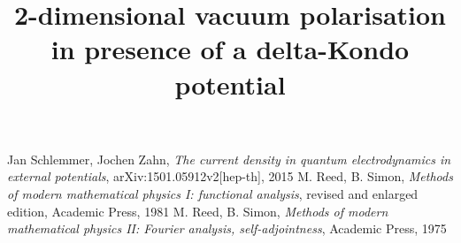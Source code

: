\documentclass[11pt, oneside]{article}   	%
\title{2-dimensional vacuum polarisation in presence of a delta-Kondo potential}
\author{}
\begin{document}
\maketitle


\begin{thebibliography}{9}
 Jan Schlemmer, Jochen Zahn, \textit{The current density in quantum electrodynamics in external potentials}, arXiv:1501.05912v2[hep-th], 2015
 M. Reed, B. Simon, \textit{Methods of modern mathematical physics I: functional analysis}, revised and enlarged edition, Academic Press, 1981
 M. Reed, B. Simon, \textit{Methods of modern mathematical physics II: Fourier analysis, self-adjointness}, Academic Press, 1975
\end{thebibliography}
\end{document}
